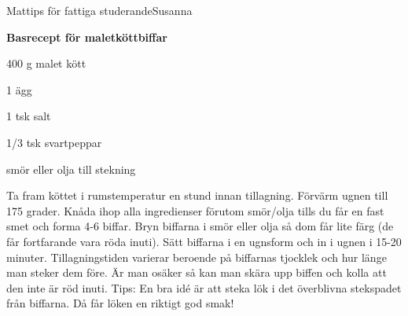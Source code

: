 \documentclass{spektraklet}
\begin{document}
\begin{artikel}{Mattips för fattiga studerande}{Susanna}
\begin{twocolumns}
\textbf{Basrecept för maletköttbiffar}

400 g malet kött 

1 ägg 

1 tsk salt 

1/3 tsk svartpeppar 

smör eller olja till stekning 

Ta fram köttet i rumstemperatur en stund innan tillagning. Förvärm ugnen till 175 grader. Knåda ihop alla ingredienser förutom smör/olja tills du får en fast smet och forma 4-6 biffar. Bryn biffarna i smör eller olja så dom får lite färg (de får fortfarande vara röda inuti). Sätt biffarna i en ugnsform och in i ugnen i 15-20 minuter. Tillagningstiden varierar beroende på biffarnas tjocklek och hur länge man steker dem före. Är man osäker så kan man skära upp biffen och kolla att den inte är röd inuti.
Tips: En bra idé är att steka lök i det överblivna stekspadet från biffarna. Då får löken en riktigt god smak!


\end{twocolumns}
\end{artikel}
\end{document}
